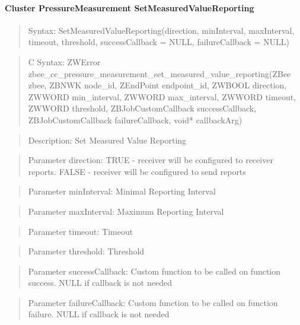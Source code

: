 \paragraph{Cluster PressureMeasurement SetMeasuredValueReporting}
\begin{quote}Syntax: SetMeasuredValueReporting(direction, minInterval, maxInterval, timeout, threshold, successCallback = NULL, failureCallback = NULL)\end{quote}
\begin{quote}C Syntax: ZWError zbee\_cc\_pressure\_measurement\_set\_measured\_value\_reporting(ZBee zbee, ZBNWK node\_id, ZEndPoint endpoint\_id, ZWBOOL direction, ZWWORD min\_interval, ZWWORD max\_interval, ZWWORD timeout, ZWWORD threshold, ZBJobCustomCallback successCallback, ZBJobCustomCallback failureCallback, void* callbackArg)\end{quote}
\begin{quote}Description: Set Measured Value Reporting\end{quote}
\begin{quote}Parameter direction: TRUE  - receiver will be configured to receiver reports. FALSE - receiver will be configured to send reports\end{quote}
\begin{quote}Parameter minInterval: Minimal Reporting Interval\end{quote}
\begin{quote}Parameter maxInterval: Maximum Reporting Interval\end{quote}
\begin{quote}Parameter timeout: Timeout\end{quote}
\begin{quote}Parameter threshold: Threshold\end{quote}
\begin{quote}Parameter successCallback: Custom function to be called on function success. NULL if callback is not needed\end{quote}
\begin{quote}Parameter failureCallback: Custom function to be called on function failure. NULL if callback is not needed\end{quote}


